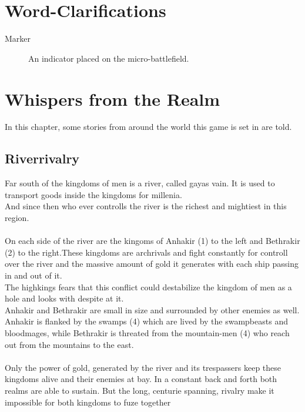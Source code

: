 \documentclass[a5paper,pagesize,10pt,bibtotoc,pointlessnumbers,
normalheadings,DIV=9,twoside=false]{scrbook}
\begin{document}
\chapter{Word-Clarifications}

\begin{description}
\item[Marker]
An indicator placed on the micro-battlefield.
\end{description}


\chapter{Whispers from the Realm}

In this chapter, some stories from around the world this game is set in are told.

\section{Riverrivalry}

Far south of the kingdoms of men is a river, called gayas vain. It is used to transport goods inside the kingdoms for millenia.\\
And since then who ever controlls the river is the richest and mightiest in this region.\\
\\
On each side of the river are the kingoms of Anhakir (1) to the left and Bethrakir (2) to the right.These kingdoms are archrivals and fight constantly for controll over the river and the massive amount of gold it generates with each ship passing in and out of it.\\
The highkings fears that this conflict could destabilize the kingdom of men as a hole and looks with despite at it.\\
Anhakir and Bethrakir are small in size and surrounded by other enemies as well.\\
Anhakir is flanked by the swamps (4) which are lived by the swampbeasts and bloodmages, while Bethrakir is threated from the mountain-men (4) who reach out from the mountains to the east.\\
\\
Only the power of gold, generated by the river and its trespassers keep these kingdoms alive and their enemies at bay. In a constant back and forth both realms are able to sustain. But the long, centurie spanning, rivalry make it impossible for both kingdoms to fuze together
\end{document}
